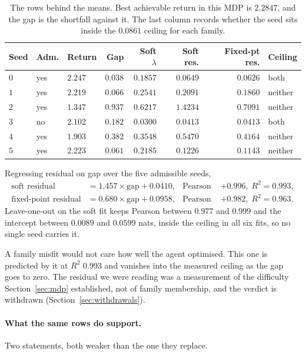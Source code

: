 \documentclass[11pt]{article}
\theoremstyle{remark}
\begin{document}
\begin{table}[t]
\centering
\begin{tabular}{lllrrrrl}
\toprule
Seed & Adm. & Return & Gap & Soft $\lambda$ & Soft res. & Fixed-pt res. & Ceiling \\
\midrule
$0$ & yes & $2.247$ & $0.038$ & $0.1857$ & $\mathbf{0.0649}$ & $\mathbf{0.0626}$ & both \\
$1$ & yes & $2.219$ & $0.066$ & $0.2541$ & $0.2091$ & $0.1860$ & neither \\
$2$ & yes & $1.347$ & $0.937$ & $0.6217$ & $1.4234$ & $0.7091$ & neither \\
$3$ & no  & $2.102$ & $0.182$ & $0.0300$ & $0.0413$ & $0.0413$ & both \\
$4$ & yes & $1.903$ & $0.382$ & $0.3548$ & $0.5470$ & $0.4164$ & neither \\
$5$ & yes & $2.223$ & $0.061$ & $0.2185$ & $0.1226$ & $0.1143$ & neither \\
\bottomrule
\end{tabular}
\caption{The rows behind the means. Best achievable return in this MDP is
$2.2847$, and the gap is the shortfall against it. The last column records
whether the seed sits inside the $0.0861$ ceiling for each family.}
\label{tab:gap}
\end{table}

Regressing residual on gap over the five admissible seeds,
\begin{align}
  \text{soft residual} &= 1.457 \times \text{gap} + 0.0410,
  & \text{Pearson } &+0.996, \; R^2 = 0.993, \label{eq:gapfit-soft}\\
  \text{fixed-point residual} &= 0.680 \times \text{gap} + 0.0958,
  & \text{Pearson } &+0.982, \; R^2 = 0.963. \label{eq:gapfit-rule}
\end{align}
Leave-one-out on the soft fit keeps Pearson between $0.977$ and $0.999$ and the
intercept between $0.0089$ and $0.0599$ nats, inside the ceiling in all six fits,
so no single seed carries it.

A family misfit would not care how well the agent optimised. This one is
predicted by it at $R^2$ $0.993$ and vanishes into the measured ceiling as the
gap goes to zero. The residual we were reading was a measurement of the
difficulty Section~\ref{sec:mdp} established, not of family membership, and the
verdict is withdrawn (Section~\ref{sec:withdrawals}).

\paragraph{What the same rows do support.} Two statements, both weaker than the
one they replace.
\end{document}
